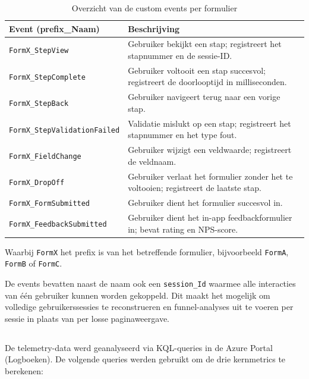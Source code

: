 \begin{table}[h]
  \centering
  \caption[Custom Application Insights events]{Overzicht van de custom events per formulier}
  \label{tab:ai-events}
  \begin{tabular}{lp{8cm}}
    \hline
    \textbf{Event (prefix\_Naam)} & \textbf{Beschrijving} \\
    \hline
    \texttt{FormX\_StepView}             & Gebruiker bekijkt een stap; registreert het stapnummer en de sessie-ID. \\
    \texttt{FormX\_StepComplete}         & Gebruiker voltooit een stap succesvol; registreert de doorlooptijd in milliseconden. \\
    \texttt{FormX\_StepBack}             & Gebruiker navigeert terug naar een vorige stap. \\
    \texttt{FormX\_StepValidationFailed} & Validatie mislukt op een stap; registreert het stapnummer en het type fout. \\
    \texttt{FormX\_FieldChange}          & Gebruiker wijzigt een veldwaarde; registreert de veldnaam. \\
    \texttt{FormX\_DropOff}             & Gebruiker verlaat het formulier zonder het te voltooien; registreert de laatste stap. \\
    \texttt{FormX\_FormSubmitted}        & Gebruiker dient het formulier succesvol in. \\
    \texttt{FormX\_FeedbackSubmitted}    & Gebruiker dient het in-app feedbackformulier in; bevat rating en NPS-score. \\
    \hline
  \end{tabular}
\end{table}

Waarbij \texttt{FormX} het prefix is van het betreffende formulier, bijvoorbeeld \texttt{FormA}, \texttt{FormB} of \texttt{FormC}.

De events bevatten naast de naam ook een \texttt{session\_Id} waarmee alle interacties van één gebruiker kunnen worden gekoppeld. Dit maakt het mogelijk om volledige gebruikerssessies te reconstrueren en funnel-analyses uit te voeren per sessie in plaats van per losse paginaweergave.

\subsection{}

De telemetry-data werd geanalyseerd via KQL-queries in de Azure Portal (Logboeken). De volgende queries werden gebruikt om de drie kernmetrics te berekenen:

